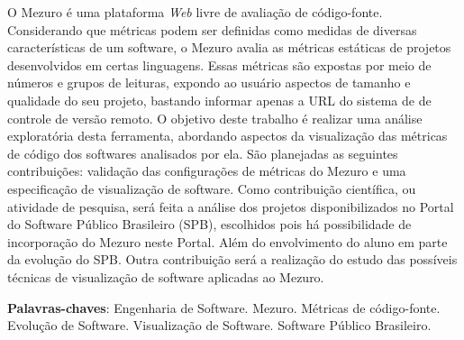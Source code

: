 \begin{resumo}
 O Mezuro é uma plataforma \textit{Web} livre de avaliação de código-fonte.
 Considerando que métricas podem ser definidas como medidas de diversas
 características de um software, o Mezuro avalia as métricas estáticas de
 projetos desenvolvidos em certas linguagens. Essas métricas são expostas por
 meio de números e grupos de leituras, expondo ao usuário aspectos de tamanho e
 qualidade do seu projeto, bastando informar apenas a URL do sistema de
 de controle de versão remoto.
 O objetivo deste trabalho é realizar uma análise exploratória desta ferramenta,
 abordando aspectos da visualização das métricas de código dos softwares
 analisados por ela.
 São planejadas as seguintes contribuições: validação das configurações de
 métricas do Mezuro e uma especificação de visualização de software.
 Como contribuição científica, ou atividade de pesquisa, será feita a análise
 dos projetos disponibilizados no Portal do Software Público Brasileiro (SPB),
 escolhidos pois há possibilidade de incorporação do Mezuro neste Portal. Além
 do envolvimento do aluno em parte da evolução do SPB.
 Outra contribuição será a realização do estudo das possíveis técnicas de
 visualização de software aplicadas ao Mezuro.

 \vspace{\onelineskip}

 \noindent
 \textbf{Palavras-chaves}: Engenharia de Software. Mezuro.
 Métricas de código-fonte. Evolução de Software. Visualização de Software.
 Software Público Brasileiro.
\end{resumo}
